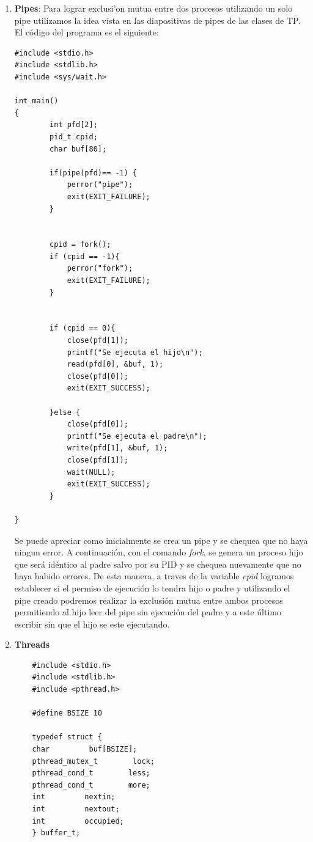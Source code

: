 \documentclass[a4paper,11pt] {article}
\begin{document}
\begin{enumerate}

	\item \textbf{Pipes}: Para lograr exclusi'on mutua entre dos procesos utilizando un solo pipe utilizamos la idea vista en las diapositivas de pipes de las clases de TP. El c\'odigo del programa es el siguiente:
	\begin{verbatim}
#include <stdio.h>
#include <stdlib.h>
#include <sys/wait.h>

int main()
{
        int pfd[2];
        pid_t cpid;
        char buf[80];

        if(pipe(pfd)== -1) {
            perror("pipe");
            exit(EXIT_FAILURE);
        }


        cpid = fork();
        if (cpid == -1){
            perror("fork");
            exit(EXIT_FAILURE);
        }


        if (cpid == 0){
            close(pfd[1]);
            printf("Se ejecuta el hijo\n");
            read(pfd[0], &buf, 1);
            close(pfd[0]);
            exit(EXIT_SUCCESS);

        }else {
            close(pfd[0]);
            printf("Se ejecuta el padre\n");
            write(pfd[1], &buf, 1);
            close(pfd[1]);
            wait(NULL);
            exit(EXIT_SUCCESS);
        }

}
	\end{verbatim}

	Se puede apreciar como inicialmente se crea un pipe y se chequea que no haya ningun error. A continuaci\'on, con el comando \textit{fork}, se genera un proceso hijo que ser\'a id\'entico al padre salvo por su PID y se chequea nuevamente que no haya habido errores. De esta manera, a traves de la variable \textit{cpid} logramos establecer si el permiso de ejecuci\'on lo tendra hijo o padre y utilizando el pipe creado podremos realizar la exclusi\'on mutua entre ambos procesos permitiendo al hijo leer del pipe sin ejecuci\'on del padre y a este \'ultimo escribir sin que el hijo se este ejecutando.

	\item \textbf{Threads}

	\begin{verbatim}
	#include <stdio.h>
	#include <stdlib.h>
	#include <pthread.h>
	
	#define BSIZE 10
	
	typedef struct {
	char         buf[BSIZE];
	pthread_mutex_t        lock;
	pthread_cond_t        less;
	pthread_cond_t        more;
	int         nextin;
	int         nextout;
	int         occupied;
	} buffer_t;
	

\end{verbatim}
\end{enumerate}
\end{document}
